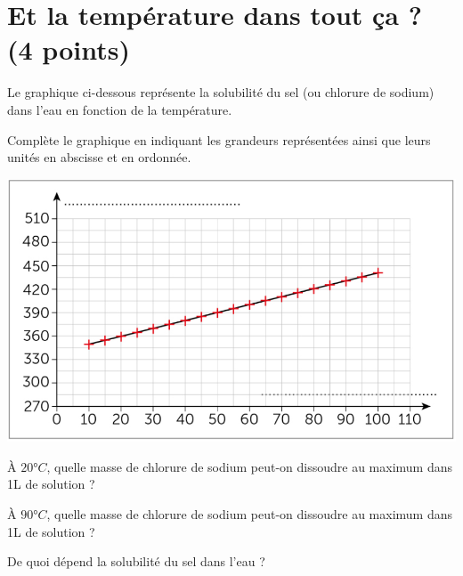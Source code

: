 \section{Et la température dans tout ça ? (4 points)}

Le graphique ci-dessous représente la solubilité du  sel (ou chlorure de sodium) dans l'eau en fonction de la température.

\begin{questions}
	\question[2] Complète le graphique en indiquant les grandeurs représentées ainsi que leurs unités en abscisse et en ordonnée.
	
	\begin{center}
		\includegraphics[scale=0.7]{img/courbe}
	\end{center}

	\question[1] \`A $20 $°$C$, quelle masse de chlorure de sodium peut-on dissoudre au maximum dans 1L de solution ?
	
	\question[1] \`A $90 $°$C$, quelle masse de chlorure de sodium peut-on dissoudre au maximum dans 1L de solution ?
	
	\question[1] De quoi dépend la solubilité du sel dans l'eau ?
\end{questions}
